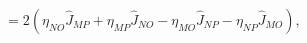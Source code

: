 \begin{equation}
[\hat{J}_{MN},\hat{J}_{OP}]=2\left(
\eta_{NO}\hat{J}_{MP}
+\eta_{MP}\hat{J}_{NO}
-\eta_{MO}\hat{J}_{NP}
-\eta_{NP}\hat{J}_{MO}
\right), 
\label{so(5,1)}
\end{equation}


